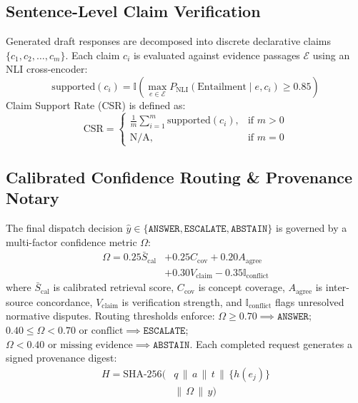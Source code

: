 \documentclass[journal,twoside]{IEEEtran}
\begin{document}
\subsection{Sentence-Level Claim Verification}
Generated draft responses are decomposed into discrete declarative claims $\{c_1, c_2, \ldots, c_m\}$.
Each claim $c_i$ is evaluated against evidence passages $\mathcal{E}$ using an NLI cross-encoder:
\begin{equation}
  \text{supported}(c_i) = \mathbb{I}\left( \max_{e \in \mathcal{E}} P_{\text{NLI}}(\text{Entailment} \mid e, c_i) \geq 0.85 \right)
  \label{eq:nli}
\end{equation}
Claim Support Rate (CSR) is defined as:
\begin{equation}
  \text{CSR} = \begin{cases}
    \frac{1}{m}\sum_{i=1}^m \text{supported}(c_i), & \text{if } m > 0 \\
    \text{N/A}, & \text{if } m = 0
  \end{cases}
  \label{eq:csr}
\end{equation}

\subsection{Calibrated Confidence Routing \& Provenance Notary}
The final dispatch decision $\hat{y} \in \{\texttt{ANSWER}, \texttt{ESCALATE}, \texttt{ABSTAIN}\}$ is governed by a multi-factor confidence metric $\Omega$:
\begin{align}
  \Omega = 0.25 \bar{S}_{\text{cal}} &+ 0.25 C_{\text{cov}} + 0.20 A_{\text{agree}} \nonumber \\
  &+ 0.30 V_{\text{claim}} - 0.35 \mathbb{I}_{\text{conflict}}
  \label{eq:confidence}
\end{align}
where $\bar{S}_{\text{cal}}$ is calibrated retrieval score, $C_{\text{cov}}$ is concept coverage, $A_{\text{agree}}$ is inter-source concordance, $V_{\text{claim}}$ is verification strength, and $\mathbb{I}_{\text{conflict}}$ flags unresolved normative disputes.
Routing thresholds enforce:
$\Omega \geq 0.70 \implies \texttt{ANSWER}$;
$0.40 \leq \Omega < 0.70 \text{ or conflict} \implies \texttt{ESCALATE}$;
$\Omega < 0.40 \text{ or missing evidence} \implies \texttt{ABSTAIN}$.
Each completed request generates a signed provenance digest:
\begin{align}
  H = \text{SHA-256}\big( &q \,\|\, a \,\|\, t \,\|\, \{h(e_j)\} \nonumber \\
  &\|\, \Omega \,\|\, \hat{y} \big)
  \label{eq:receipt}
\end{align}
\end{document}
